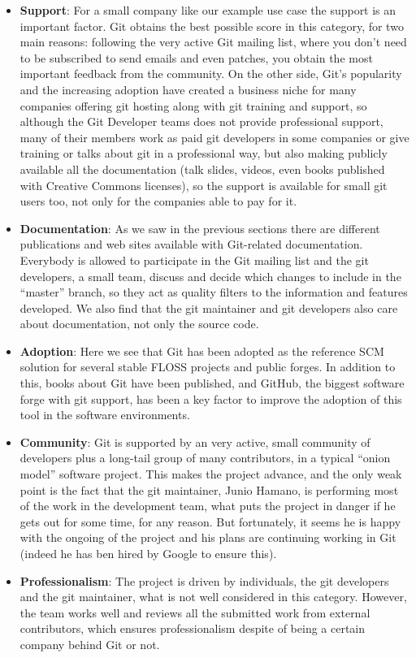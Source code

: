 \documentclass[a4paper,10pt]{article}
\begin{document}
\begin{itemize}
\item \textbf{Support}: For a small company like our example use case the
support is an important factor. Git obtains the best possible score in this
category, for two main reasons: following the very active Git mailing list,
where you don't need to be subscribed to send emails and even patches, you
obtain
the most important feedback from the community. On the other side, Git's
popularity and the increasing adoption have created a business niche for many
companies offering git hosting along with git training and support, so although
the Git Developer teams does not provide professional support, many of their
members work as paid git developers in some companies or give training or talks
about git in a professional way, but also making publicly available all the
documentation (talk slides, videos, even books published with Creative Commons
licenses), so the support is available for small git users too, not only for
the companies able to pay for it.
 
\item \textbf{Documentation}: As we saw in the previous sections there are
different publications and web sites available with Git-related
documentation. Everybody is allowed to participate in the Git mailing list and
the git developers, a small team, discuss and decide which changes to include
in the ``master'' branch, so they act as quality filters to the information and
features developed. We also find that the git maintainer and git developers also
care about documentation, not only the source code.

\item \textbf{Adoption}: Here we see that Git has been adopted as the reference
SCM solution for several stable FLOSS projects and public forges. In addition
to this, books about Git have been published, and GitHub, the biggest software
forge with git support, has been a key factor to improve the adoption of this
tool in the software environments.

\item \textbf{Community}: Git is supported by an very active, small community of
developers plus a long-tail group of many contributors, in a typical ``onion
model'' software project. This makes the project advance, and the only weak
point is the fact that the git maintainer, Junio Hamano, is performing most of
the work in the development team, what puts the project in danger if he gets
out for some time, for any reason. But fortunately, it seems he is happy with
the ongoing of the project and his plans are continuing working in Git (indeed
he has ben hired by Google to ensure this).
 
\item \textbf{Professionalism}: The project is driven by individuals, the git
developers and the git maintainer, what is not well considered in this
category. However, the team works well and reviews all the submitted work from
external contributors, which ensures professionalism despite of being a certain
company behind Git or not.
\end{itemize}
\end{document}
